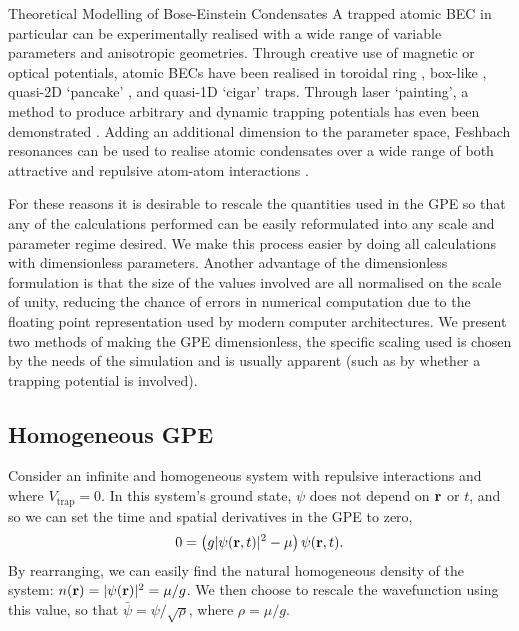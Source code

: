 \begin{chapter}{\label{cha:theoretical_model}Theoretical Modelling of Bose-Einstein Condensates}
	A trapped atomic BEC in particular can be experimentally realised with a wide range of variable parameters and anisotropic geometries. Through creative use of magnetic or optical potentials, atomic BECs have been realised in toroidal ring \cite{persistent,Ramanathan11}, box-like \cite{gaunt_2013,chomaz_2015}, quasi-2D `pancake' \cite{Neely}, and quasi-1D `cigar' \cite{Burger99,Weller08} traps. Through laser `painting', a method to produce arbitrary and dynamic trapping potentials has even been demonstrated \cite{Henderson09}. Adding an additional dimension to the parameter space, Feshbach resonances can be used to realise atomic condensates over a wide range of both attractive and repulsive atom-atom interactions \cite{Inouye1998}.

	For these reasons it is desirable to rescale the quantities used in the GPE so that any of the calculations performed can be easily reformulated into any scale and parameter regime desired. We make this process easier by doing all calculations with dimensionless parameters. Another advantage of the dimensionless formulation is that the size of the values involved are all normalised on the scale of unity, reducing the chance of errors in numerical computation due to the floating point representation used by modern computer architectures.
	We present two methods of making the GPE dimensionless, the specific scaling used is chosen by the needs of the simulation and is usually apparent (such as by whether a trapping potential is involved).

	\subsection{\label{section:gpedimlesshomg} Homogeneous GPE}
		Consider an infinite and homogeneous system with repulsive interactions and where $V_{\mathrm{trap}} = 0$. In this system's ground state, $\psi$ does not depend on ${\bf r}$ or $t$, and so we can set the time and spatial derivatives in the GPE to zero,
		\begin{equation}
		0 = \left(g|\psi({\bf r},t)|^2 - \mu \right) \psi({\bf r},t).
		\end{equation}
		By rearranging, we can easily find the natural homogeneous density of the system: $n({\bf r}) = |\psi({\bf r})|^2 = \mu/g$. We then choose to rescale the wavefunction using this value, so that $\bar{\psi} = \psi/\sqrt{\rho}$, where $\rho = \mu/g$.


\end{chapter}
